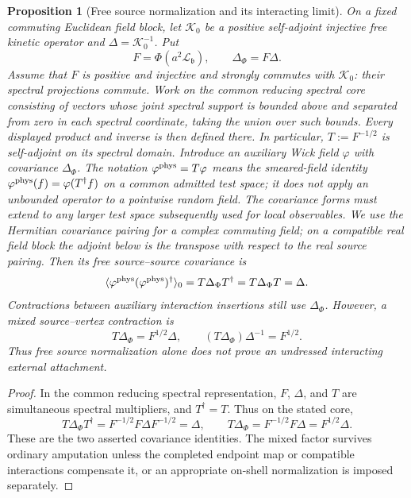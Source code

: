 \documentclass[final,5p,times,twocolumn,numbers,nopreprintline]{elsarticle}
\numberwithin{equation}{section}
\newtheorem{proposition}[theorem]{Proposition}
\theoremstyle{definition}
\theoremstyle{remark}
\newcommand{\bb}{\mathfrak b}
\newcommand{\Ph}{\Phi}
\begin{document}
\begin{proposition}[Free source normalization and its interacting limit]
\label{prop:free-source-normalization}
On a fixed commuting Euclidean field block, let
\(\mathscr K_0\) be a positive self-adjoint injective free kinetic
operator and \(\Delta=\mathscr K_0^{-1}\). Put
\[
 F=\Ph(a^2\mathscr L_{\bb}),\qquad \Delta_\Ph=F\Delta.
\]
Assume that \(F\) is positive and injective and strongly commutes
with \(\mathscr K_0\): their spectral projections commute.
Work on the common reducing spectral core consisting of vectors
whose joint spectral support is bounded above and separated from
zero in each spectral coordinate, taking the union over such
bounds. Every displayed product
and inverse is then defined there. In particular,
\(T:=F^{-1/2}\) is self-adjoint on its spectral domain.
Introduce an auxiliary Wick field \(\varphi\) with covariance
\(\Delta_\Ph\). The notation \(\varphi^{\rm phys}=T\varphi\)
means the smeared-field identity
\(\varphi^{\rm phys}(f)=\varphi(T^\dagger f)\) on a common
admitted test space; it does not apply an unbounded operator to a
pointwise random field. The covariance forms must extend to any
larger test space subsequently used for local observables.
We use the Hermitian covariance pairing for a complex commuting
field; on a compatible real field block the adjoint below is the
transpose with respect to the real source pairing.
Then its free source--source covariance is
\begin{equation}
 \langle\varphi^{\rm phys}
             (\varphi^{\rm phys})^\dagger\rangle_0
 =T\Delta_\Ph T^\dagger
 =T\Delta_\Ph T=\Delta.
 \label{eq:undressed-source-covariance}
\end{equation}
Contractions between auxiliary interaction insertions still use
\(\Delta_\Ph\). However, a mixed source--vertex contraction is
\begin{equation}
 T\Delta_\Ph=F^{1/2}\Delta,
 \qquad
 (T\Delta_\Ph)\Delta^{-1}=F^{1/2}.
 \label{eq:mixed-source-half-factor}
\end{equation}
Thus free source normalization alone does not prove an undressed
interacting external attachment.
\end{proposition}

\begin{proof}
In the common reducing spectral representation,
\(F\), \(\Delta\), and \(T\) are simultaneous spectral
multipliers, and \(T^\dagger=T\). Thus on the stated core,
\[
 T\Delta_\Ph T^\dagger
 =F^{-1/2}F\Delta F^{-1/2}=\Delta,
 \qquad
 T\Delta_\Ph=F^{-1/2}F\Delta=F^{1/2}\Delta.
\]
These are the two asserted covariance identities. The mixed factor
survives ordinary amputation unless the completed endpoint map or
compatible interactions compensate it, or an appropriate on-shell
normalization is imposed separately.
\end{proof}
\end{document}
